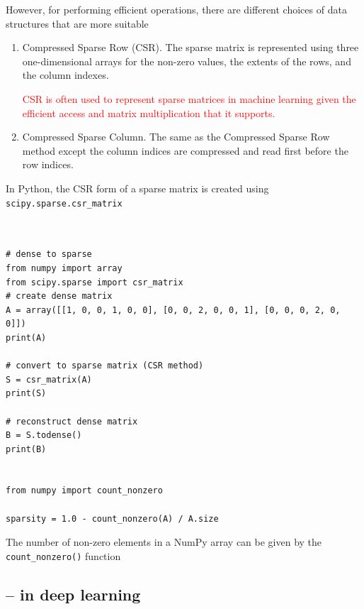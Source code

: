 However, for performing efficient operations, there are different choices of
data structures that are more suitable
\begin{enumerate}
  
  \item Compressed Sparse Row (CSR). The sparse matrix is represented using three
  one-dimensional arrays for the non-zero values, the extents of the rows, and
  the column indexes.
  
 \textcolor{red}{CSR is often used to represent sparse matrices in machine
 learning given the
  efficient access and matrix multiplication that it supports.}
  
  \item Compressed Sparse Column. The same as the Compressed Sparse Row method
  except the column indices are compressed and read first before the row
  indices.
  
\end{enumerate}

In Python, the CSR form of a sparse matrix is created using \verb!scipy.sparse.csr_matrix!
\begin{lstlisting}


# dense to sparse
from numpy import array
from scipy.sparse import csr_matrix
# create dense matrix
A = array([[1, 0, 0, 1, 0, 0], [0, 0, 2, 0, 0, 1], [0, 0, 0, 2, 0, 0]])
print(A)

# convert to sparse matrix (CSR method)
S = csr_matrix(A)
print(S)

# reconstruct dense matrix
B = S.todense()
print(B)


from numpy import count_nonzero

sparsity = 1.0 - count_nonzero(A) / A.size

\end{lstlisting}

The number of non-zero elements in a NumPy array can be given by the \verb!count_nonzero()! function


\subsection{-- in deep learning}


